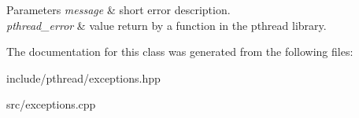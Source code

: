 \begin{DoxyParams}{Parameters}
{\em message} & short error description. \\
\hline
{\em pthread\+\_\+error} & value return by a function in the pthread library. \\
\hline
\end{DoxyParams}


The documentation for this class was generated from the following files\+:\begin{DoxyCompactItemize}
\item 
include/pthread/exceptions.\+hpp\item 
src/exceptions.\+cpp\end{DoxyCompactItemize}
